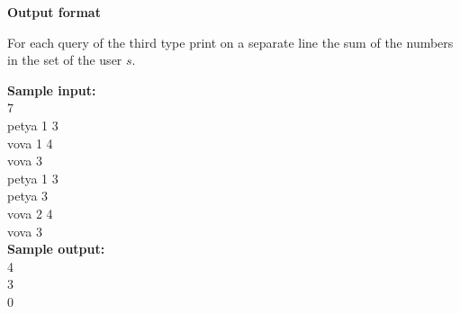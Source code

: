\documentclass[a4paper]{article}
\begin{document}
\textbf{Output format}

For each query of the third type print on a separate line the sum of the numbers in the set of the user $s$.

\LINE

\noindent \textbf{Sample input:}\\
7\\
petya 1 3\\
vova 1 4\\
vova 3\\
petya 1 3\\
petya 3\\
vova 2 4\\
vova 3\\

\noindent \textbf{Sample output:}\\
4\\
3\\
0\\
\end{document}
